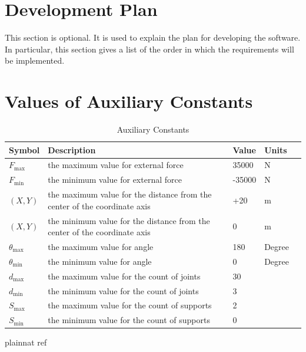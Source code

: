 \documentclass[12pt]{article}
\begin{document}
\section{Development Plan}

This section is optional.  It is used to explain the plan for developing the software.  In particular, this section gives a list of the order in which the requirements will be implemented.


\section{Values of Auxiliary Constants}
\begin{table}[h!]
	\renewcommand{\arraystretch}{1.2}
	\noindent \begin{longtable*}{l l l l c} 
		\toprule
		\textbf{Symbol} & \textbf{Description} & \textbf{Value} & 
		\textbf{Units} \\
		\midrule 
		$F_{\text{max}}$ & the maximum value for external force & 35000 & 
		\si{\newton}\\
		$F_{\text{min}}$ & the minimum value for external force & -35000 & 
		\si{\newton}\\
        $(X, Y)$ & the maximum value for the distance from the center of the coordinate axis & +20 & 
		\si{\metre}\\
        $(X, Y)$ & the minimum value for the distance from the center of the coordinate axis & 0 & 
		\si{\metre}\\
  	
		$\theta_{\text{max}}$ & the maximum value for angle & 180 & 
		Degree\\
		$\theta_{\text{min}}$ & the minimum value for angle & 0 & 
		Degree\\
  $d_{\text{max}}$ & the maximum value for the count of joints & 30 & 
		\\
		$d_{\text{min}}$ & the minimum value for the count of joints &  3 & \\
  $S_{\text{max}}$ & the maximum value for the count of supports & 2 & 
		\\
		$S_{\text{min}}$ & the minimum value for the count of supports &  0 & 
		\\
		\bottomrule		
	\end{longtable*}
	\caption{Auxiliary Constants} \label{TblAuxConst}
\end{table}



\newpage

 {plainnat}
 {ref}
\end{document}
